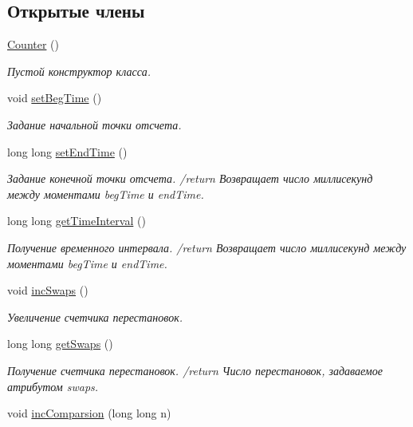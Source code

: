\subsection*{Открытые члены}
\begin{DoxyCompactItemize}
\item 
\hyperlink{class_counter_a1e05f69b5240fbab3e7ab351672167f0}{Counter} ()
\begin{DoxyCompactList}\small\item\em Пустой конструктор класса. \end{DoxyCompactList}\item 
void \hyperlink{class_counter_a71dea1262b81493aa9734f62a72b2691}{set\+Beg\+Time} ()
\begin{DoxyCompactList}\small\item\em Задание начальной точки отсчета. \end{DoxyCompactList}\item 
long long \hyperlink{class_counter_a563ab520e0e9ea20d4d4d113f566658a}{set\+End\+Time} ()
\begin{DoxyCompactList}\small\item\em Задание конечной точки отсчета. /return Возвращает число миллисекунд между моментами beg\+Time и end\+Time. \end{DoxyCompactList}\item 
long long \hyperlink{class_counter_ae5acb21f01b8317c8db1d99f7b56dc95}{get\+Time\+Interval} ()
\begin{DoxyCompactList}\small\item\em Получение временного интервала. /return Возвращает число миллисекунд между моментами beg\+Time и end\+Time. \end{DoxyCompactList}\item 
void \hyperlink{class_counter_aa0cd30379394257e44aa7afc84ed1fce}{inc\+Swaps} ()
\begin{DoxyCompactList}\small\item\em Увеличение счетчика перестановок. \end{DoxyCompactList}\item 
long long \hyperlink{class_counter_ae8d7757e6613ed651f7f505931cb377c}{get\+Swaps} ()
\begin{DoxyCompactList}\small\item\em Получение счетчика перестановок. /return Число перестановок, задаваемое атрибутом swaps. \end{DoxyCompactList}\item 
void \hyperlink{class_counter_a224d93150c0fe2982d3efd7aa99668e6}{inc\+Comparsion} (long long n)

\end{DoxyCompactItemize}
